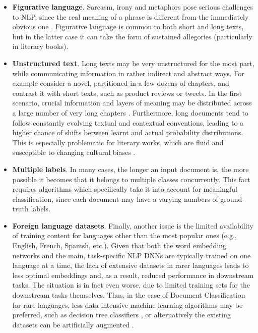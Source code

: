 \documentclass[preprint,review,12pt]{elsarticle}
\begin{document}
\begin{itemize}
\item \textbf{Figurative language}. Sarcasm, irony and metaphors pose serious challenges to NLP, since the real meaning of a phrase is different from the immediately obvious one \cite{Karamouzas2022}. Figurative language is common to both short and long texts, but in the latter case it can take the form of sustained allegories (particularly in literary books).

\item \textbf{Unstructured text}. Long texts may be very unstructured for the most part, while communicating information in rather indirect and abstract ways. For example consider a novel, partitioned in a few dozens of chapters, and contrast it with short texts, such as product reviews or tweets. In the first scenario, crucial information and layers of meaning may be distributed across a large number of very long chapters \cite{worsham}. Furthermore, long documents tend to follow constantly evolving textual and contextual conventions, leading to a higher chance of shifts between learnt and actual probability distributions. This is especially problematic for literary works, which are fluid and susceptible to changing cultural biases \cite{brazil}.

\item \textbf{Multiple labels}. In many cases, the longer an input document is, the more possible it becomes that it belongs to multiple classes concurrently. This fact requires algorithms which specifically take it into account for meaningful classification, since each document may have a varying numbers of ground-truth labels.

\item \textbf{Foreign language datasets}. Finally, another issue is the limited availability of training content for languages other than the most popular ones (e.g., English, French, Spanish, etc.). Given that both the word embedding networks and the main, task-specific NLP DNNs are typically trained on one language at a time, the lack of extensive datasets in rarer languages leads to less optimal embeddings and, as a result, reduced performance in downstream tasks. The situation is in fact even worse, due to limited training sets for the downstream tasks themselves. Thus, in the case of Document Classification for rare languages, less data-intensive machine learning algorithms may be preferred, such as decision tree classifiers \cite{brazil}, or alternatively the existing datasets can be artificially augmented \cite{geroge}.
\end{itemize}
\end{document}
